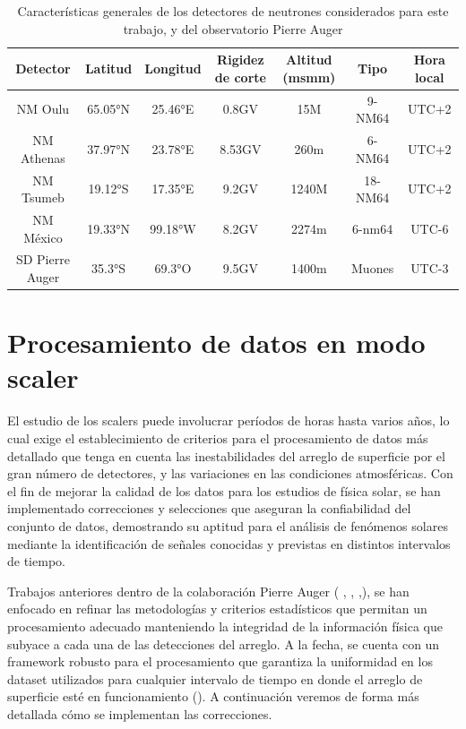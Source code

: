 \begin{table}[ht]
\centering
\caption{Características generales de los detectores de neutrones considerados para este trabajo, y del observatorio Pierre Auger}
\small
\begin{tabular}{ccccccc}
\toprule
\textbf{Detector} & \textbf{Latitud} & \textbf{Longitud} & \textbf{Rigidez de corte} & \textbf{Altitud (msmm)} & \textbf{Tipo} & \textbf{Hora local} \\
\midrule
NM Oulu & \ang{65.05}N & \ang{25.46}E & 0.8GV & 15M & 9-NM64 & UTC+2 \\
NM Athenas & \ang{37.97}N & \ang{23.78}E & 8.53GV & 260m & 6-NM64 & UTC+2 \\
NM Tsumeb & \ang{19.12}S & \ang{17.35}E & 9.2GV & 1240M & 18-NM64 & UTC+2 \\
NM México & \ang{19.33}N & \ang{99.18}W & 8.2GV & 2274m & 6-nm64 & UTC-6 \\
SD Pierre Auger& \ang{35.3}S & \ang{69.3}O & 9.5GV & 1400m & Muones & UTC-3 \\
\bottomrule
\end{tabular}
\label{tab:my_label}
\end{table}


\section{Procesamiento de datos en modo scaler}

El estudio de los scalers puede involucrar períodos de horas hasta varios años, lo cual exige el establecimiento de criterios para el procesamiento de datos más detallado que tenga en cuenta las inestabilidades del arreglo de superficie por el gran número de detectores, y las variaciones en las condiciones atmosféricas. Con el fin de mejorar la calidad de los datos para los estudios de física solar, se han implementado correcciones y selecciones que aseguran la confiabilidad del conjunto de datos, demostrando su aptitud para el análisis de fenómenos solares mediante la identificación de señales conocidas y previstas en distintos intervalos de tiempo.

Trabajos anteriores dentro de la colaboración Pierre Auger ( \cite{bertou_2011},  \cite{asorey_2012}, \cite{masias_2017} ,\cite{Martin_Schimassek2022}), se han enfocado en refinar las metodologías y criterios estadísticos que permitan un procesamiento adecuado manteniendo la integridad de la información física que subyace a cada una de las detecciones del arreglo. A la fecha, se cuenta con un framework robusto para el procesamiento que garantiza la uniformidad en los dataset utilizados para cualquier intervalo de tiempo en donde el arreglo de superficie esté en funcionamiento (\cite{martin_ICRC}). A continuación veremos de forma más detallada cómo se implementan las correcciones.

